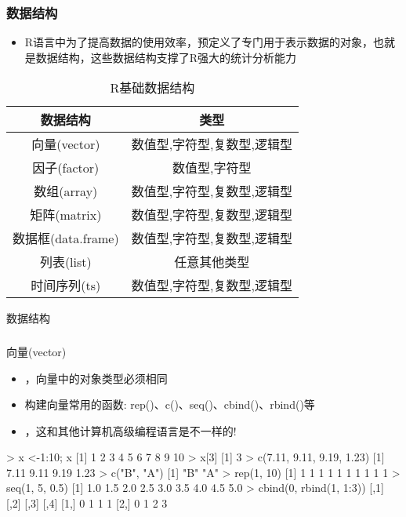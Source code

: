 \subsubsection{数据结构}
\begin{frame}[t]{\subsecname}{\subsubsecname}
  \begin{itemize}
  \item R语言中为了提高数据的使用效率，预定义了专门用于表示数据的对象，也就是数据结构，这些数据结构支撑了R强大的统计分析能力
  \end{itemize}
  \begin{table} \centering \small
    \begin{tabular}{|c|c|}
      \toprule
      \rowcolor{LightCyan}
      \textbf{数据结构} & \textbf{类型}\\\hline
      向量(vector) & 数值型,字符型,复数型,逻辑型\\\hline
      因子(factor) & 数值型,字符型\\\hline
      数组(array) & 数值型,字符型,复数型,逻辑型\\\hline
      矩阵(matrix) & 数值型,字符型,复数型,逻辑型 \\\hline
      数据框(data.frame) & 数值型,字符型,复数型,逻辑型 \\\hline
      列表(list) & 任意其他类型 \\\hline
      时间序列(ts) & 数值型,字符型,复数型,逻辑型\\
      \bottomrule
    \end{tabular}
    \caption{R基础数据结构}
  \end{table}
\end{frame}

\begin{frame}[t,fragile]{\subsecname}{数据结构}
  \frametitle{}{向量(vector)}
  \begin{itemize}
  \item {}，向量中的对象类型必须相同
  \item 构建向量常用的函数: rep()、c()、seq()、cbind()、rbind()等
  \item {}，这和其他计算机高级编程语言是不一样的!
  \end{itemize}  

\begin{rcode}
> x <-1:10; x
[1]  1  2  3  4  5  6  7  8  9 10
> x[3]
[1] 3
> c(7.11, 9.11, 9.19, 1.23)
[1] 7.11 9.11 9.19 1.23
> c("B", "A")
[1] "B" "A"
> rep(1, 10)
[1] 1 1 1 1 1 1 1 1 1 1
> seq(1, 5, 0.5)
[1] 1.0 1.5 2.0 2.5 3.0 3.5 4.0 4.5 5.0
> cbind(0, rbind(1, 1:3))
     [,1] [,2] [,3] [,4]
[1,]    0    1    1    1
[2,]    0    1    2    3
\end{rcode}  
\end{frame}

